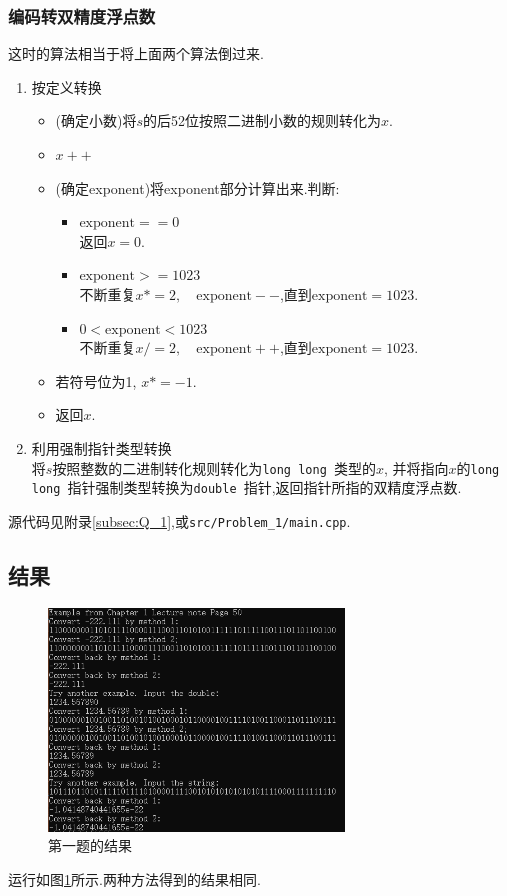 \documentclass[UTF-8]{article}
\begin{document}
\subsubsection{编码转双精度浮点数}
这时的算法相当于将上面两个算法倒过来.
\begin{enumerate}
\item 按定义转换
\begin{itemize}
	\item (确定小数)将$s$的后52位按照二进制小数的规则转化为$x$.
	\item $x++$
	\item (确定exponent)将exponent部分计算出来.判断: 
	\begin{itemize}
		\item $\text{exponent}==0$ \\
		返回$x=0$.
		\item $\text{exponent}>=1023$ \\
		不断重复$x*=2,\quad\text{exponent}--$,直到$\text{exponent}=1023$.
		\item $0<\text{exponent}<1023$ \\
		不断重复$x/=2,\quad\text{exponent}++$,直到$\text{exponent}=1023$.
	\end{itemize}
	\item 若符号位为1, $x*=-1$.
	\item 返回$x$.
\end{itemize}

\item 利用强制指针类型转换\\
将$s$按照整数的二进制转化规则转化为\texttt{long long }类型的$x$, 并将指向$x$的\texttt{long long }指针强制类型转换为\texttt{double }指针,返回指针所指的双精度浮点数.
\end{enumerate}
源代码见附录\ref{subsec:Q_1},或\texttt{src/Problem\_1/main.cpp}.
\subsection{结果}
\begin{figure}[h]
	\centering
	\includegraphics[width=0.7\textwidth]{Q_1.png}
	\caption{第一题的结果}
	\label{fig:Q_1}
\end{figure}
运行如图\ref{fig:Q_1}所示.两种方法得到的结果相同.
\end{document}
